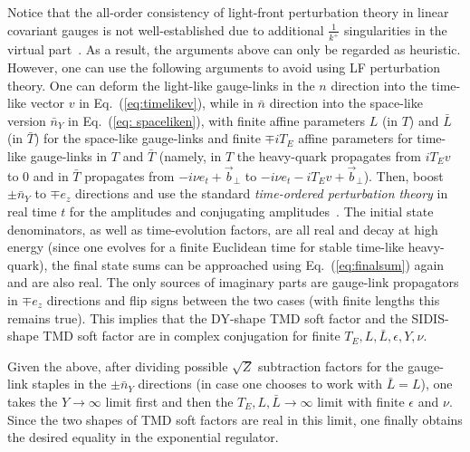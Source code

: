 \documentclass[a4paper,11pt]{article}
\begin{document}
Notice that the all-order consistency of light-front perturbation theory in linear covariant gauges is not well-established due to additional $\frac{1}{k^+}$ singularities in the virtual part~\cite{Collins:2018aqt}. As a result, the arguments above can only be regarded as heuristic. However, one can use the following arguments to avoid using LF perturbation theory. One can deform the light-like gauge-links in the $n$ direction into the time-like vector $v$ in Eq.~(\ref{eq:timelikev}), while in $\bar n$ direction into the space-like version $\bar n_Y$ in Eq.~(\ref{eq: spaceliken}), with finite affine parameters $L$ (in $T$) and $\bar L$ (in $\bar T$) for the space-like gauge-links and finite $\mp iT_E$ affine parameters for time-like gauge-links in $T$ and $\bar T$ (namely, in $T$ the heavy-quark propagates from $iT_Ev$ to $0$ and in $\bar T$ propagates from $-i\nu e_t+\vec{b}_\perp$ to $-i\nu e_t-iT_Ev+\vec{b}_\perp $). Then, boost $\pm \bar n_Y$ to $\mp e_z$ directions and use the standard {\it time-ordered perturbation theory} in real time $t$ for the amplitudes and conjugating amplitudes~\cite{Aglietti:1993hf,Hashimoto:1995in,Horgan:2009ti}. The initial state denominators, as well as time-evolution factors, are all real and decay at high energy (since one evolves for a finite Euclidean time for stable time-like heavy-quark), the final state sums can be approached using Eq.~(\ref{eq:finalsum}) again and are also real. The only sources of imaginary parts are gauge-link propagators in $\mp e_z$ directions and flip signs between the two cases (with finite lengths this remains true). This implies that the DY-shape TMD soft factor and the SIDIS-shape TMD soft factor are in complex conjugation for finite $T_E,L,\bar L, \epsilon, Y,\nu$. 

Given the above, after dividing possible $\sqrt{Z}$ subtraction factors for the gauge-link staples in the $\pm \bar n_Y$ directions (in case one chooses to work with $\bar L=L$), one takes the $Y\rightarrow \infty$ limit first and then the $T_E, L, \bar L \rightarrow \infty$ limit with finite $\epsilon$ and $\nu$. Since the two shapes of TMD soft factors are real in this limit, one finally obtains the desired equality in the exponential regulator.  






\end{document}
